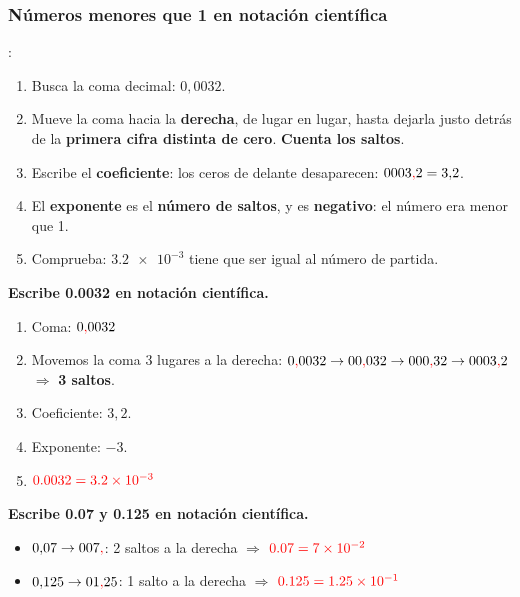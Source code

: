
\subsubsection{Números menores que 1 en notación científica}

:
\begin{enumerate}[label=\numberballmDarkTeal]
    \item Busca la coma decimal: \(0{,}0032\).
    \item Mueve la coma hacia la \textbf{derecha}, de lugar en lugar, hasta dejarla justo detrás de la \textbf{primera cifra distinta de cero}. \textbf{Cuenta los saltos}.
    \item Escribe el \textbf{coeficiente}: los ceros de delante desaparecen: \(0003\textcolor{red}{\mathbf{,}} 2 = 3{,}2\).
    \item El \textbf{exponente} es el \textbf{número de saltos}, y es \textbf{negativo}: el número era menor que 1.
    \item Comprueba: \(\num{3.2e-3}\) tiene que ser igual al número de partida.
\end{enumerate}

\begin{example}
    \textbf{Escribe \num{0.0032} en notación científica.}
    \begin{enumerate}[label=\numberballmDarkTeal]
        \item Coma: \(0\textcolor{red}{\mathbf{,}} 0032\)
        \item Movemos la coma 3 lugares a la derecha: \(0\textcolor{red}{\mathbf{,}} 0032 \to 00\textcolor{red}{\mathbf{,}} 032 \to 000\textcolor{red}{\mathbf{,}} 32 \to 0003\textcolor{red}{\mathbf{,}} 2\) \(\Rightarrow\) \textbf{3 saltos}.
        \item Coeficiente: \(3{,}2\).
        \item Exponente: \(-3\).
        \item \(\textcolor{red}{\num{0.0032} = \num{3.2e-3}}\)
    \end{enumerate}
\end{example}

\begin{example}
    \textbf{Escribe \num{0.07} y \num{0.125} en notación científica.}
    \begin{itemize}
        \item \(0{,}07 \to 007\textcolor{red}{\mathbf{,}}\): 2 saltos a la derecha \(\Rightarrow\) \(\textcolor{red}{\num{0.07} = \num{7e-2}}\)
        \item \(0{,}125 \to 01\textcolor{red}{\mathbf{,}} 25\): 1 salto a la derecha \(\Rightarrow\) \(\textcolor{red}{\num{0.125} = \num{1.25e-1}}\)
    \end{itemize}
\end{example}

